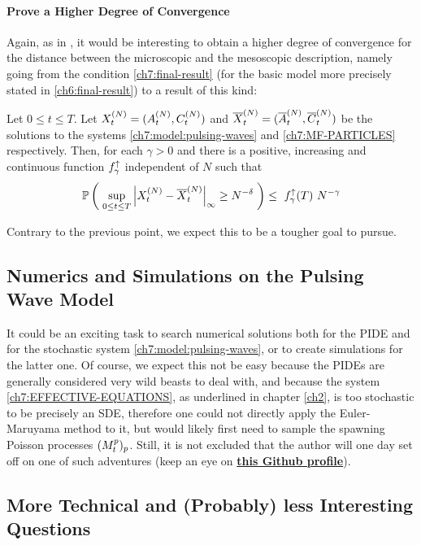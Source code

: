 	\paragraph{Prove a Higher Degree of Convergence}
	Again, as in \cite{ana}, it would be interesting to obtain a higher degree of convergence for the distance between the microscopic and the mesoscopic description, namely going from the condition \ref{ch7:final-result} (for the basic model more precisely stated in \ref{ch6:final-result}) to a result of this kind:
	\begin{proposition}\label{conc:final-result-with-higher-convergence}
		Let $0\leq t \leq T$.
		Let $X_t^{(N)} = (A_t^{(N)}, C_t^{(N)})$ and $\overline{X}_t^{(N)}= (\overline{A}_t^{(N)}, \overline{C}_t^{(N)})$ be the solutions to the systems \ref{ch7:model:pulsing-waves} and \ref{ch7:MF-PARTICLES} respectively.
		Then, for each $\gamma>0$ and there is a positive, increasing and continuous function $f^\uparrow_\gamma$ independent of $N$ such that
		\begin{equation}
			\mathbb{P} \left( \; 
				\sup_{0 \leq t \leq T}
				{ \left| 
					X_t^{(N)} - \overline{X}_t^{(N)}
				 \right|_{\infty} } 
				\geq
				N^{-\delta}
			 \; \right)
			\leq\
			f^\uparrow_{\gamma}(T)\
			N^{-\gamma}
		\end{equation}
	\end{proposition}
	Contrary to the previous point, we expect this to be a tougher goal to pursue.
	
\subsection{Numerics and Simulations on the Pulsing Wave Model}
It could be an exciting task to search numerical solutions both for the PIDE and for the stochastic system \ref{ch7:model:pulsing-waves}, or to create simulations for the latter one.
Of course, we expect this not be easy because the PIDEs are generally considered very wild beasts to deal with, and because the system \ref{ch7:EFFECTIVE-EQUATIONS}, as underlined in chapter \ref{ch2}, is too stochastic to be precisely an SDE, therefore one could not directly apply the Euler-Maruyama method to it, but would likely first need to sample the spawning Poisson processes $(M_t^p)_p$.
Still, it is not excluded that the author will one day set off on one of such adventures (keep an eye on \textbf{\href{https://github.com/carlolalu}{this Github profile}}).

\subsection{More Technical and (Probably) less Interesting Questions}

